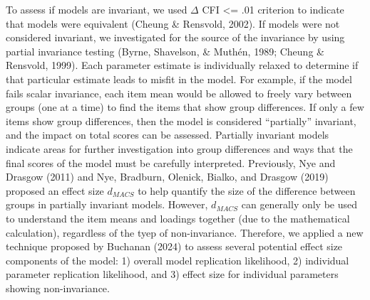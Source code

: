 \documentclass[
  english,
  man]{apa6}
\begin{document}
To assess if models are invariant, we used \(\Delta\) CFI \textless= .01
criterion to indicate that models were equivalent (Cheung \& Rensvold, 2002). If
models were not considered invariant, we investigated for the source of
the invariance by using partial invariance testing (Byrne, Shavelson, \& Muthén, 1989; Cheung \& Rensvold, 1999). Each parameter estimate is individually relaxed to
determine if that particular estimate leads to misfit in the model. For
example, if the model fails scalar invariance, each item mean would be
allowed to freely vary between groups (one at a time) to find the items
that show group differences. If only a few items show group differences,
then the model is considered ``partially'' invariant, and the impact on
total scores can be assessed. Partially invariant models indicate areas
for further investigation into group differences and ways that the final
scores of the model must be carefully interpreted. Previously, Nye and Drasgow (2011)
and Nye, Bradburn, Olenick, Bialko, and Drasgow (2019) proposed an effect size \(d_{MACS}\) to help quantify the
size of the difference between groups in partially invariant models.
However, \(d_{MACS}\) can generally only be used to understand the item
means and loadings together (due to the mathematical calculation),
regardless of the tyep of non-invariance. Therefore, we applied a new
technique proposed by Buchanan (2024) to assess several potential effect
size components of the model: 1) overall model replication likelihood,
2) individual parameter replication likelihood, and 3) effect size for
individual parameters showing non-invariance.
\end{document}
